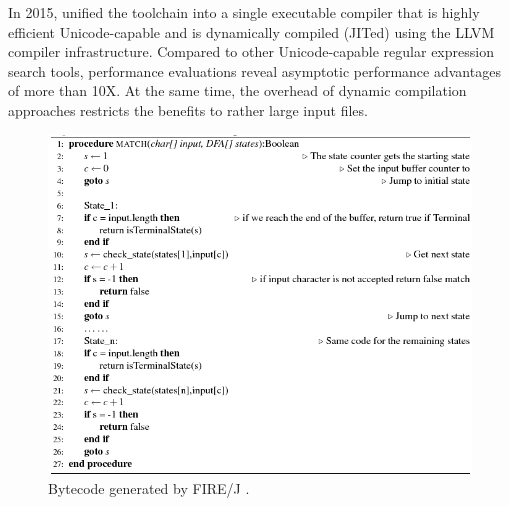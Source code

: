 In 2015, \citet{parabix} unified the toolchain into a single executable compiler that is highly efficient Unicode-capable and is dynamically compiled (JITed) using the LLVM compiler infrastructure. Compared to other Unicode-capable regular expression search tools, performance evaluations reveal asymptotic performance advantages of more than 10X. At the same time, the overhead of dynamic compilation approaches restricts the benefits to rather large input files.

\begin{figure}[htpb]
\centering
\includegraphics[width=\textwidth]{imgs/alg-byte-firej.png}
\caption{Bytecode generated by FIRE/J \cite{firejpaper}.}\label{fig:firejpaper}
\end{figure}